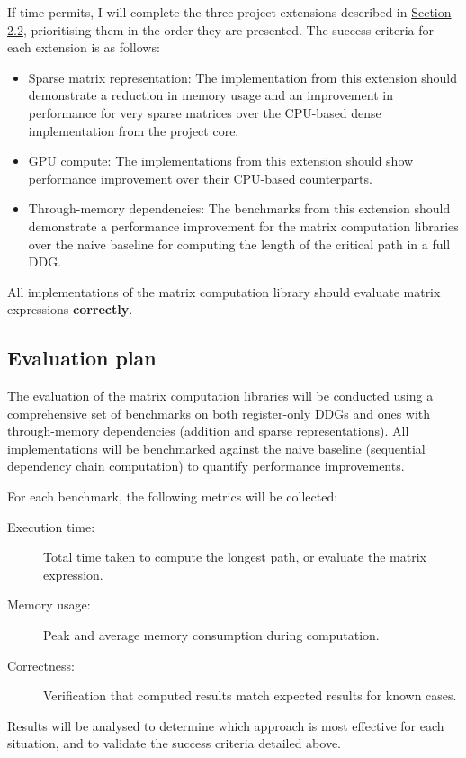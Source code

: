 \documentclass[a4paper,12pt]{article}
\begin{document}
If time permits, I will complete the three project extensions described in
\hyperref[sec:extensions]{Section 2.2}, prioritising them in the order they are presented.
The success criteria for each extension is as follows:
\begin{itemize}
  \item Sparse matrix representation: The implementation from this extension should
    demonstrate a reduction in memory usage and an improvement in performance for very
    sparse matrices over the CPU-based dense implementation from the project core.
  \item GPU compute: The implementations from this extension should show
    performance improvement over their CPU-based counterparts.
  \item Through-memory dependencies: The benchmarks from this extension should
    demonstrate a performance improvement for the matrix computation libraries over
    the naive baseline for computing the length of the critical path in a full DDG.
\end{itemize}

All implementations of the matrix computation library should evaluate matrix
expressions \textbf{correctly}.

\subsection{Evaluation plan}
\label{sec:eval}

The evaluation of the matrix computation libraries will be conducted using a
comprehensive set of benchmarks on both register-only DDGs and ones with through-memory
dependencies (addition and sparse representations).
All implementations will be benchmarked against the naive baseline (sequential
dependency chain computation) to quantify performance improvements.

For each benchmark, the following metrics will be collected:
\begin{description}
  \item[Execution time:] Total time taken to compute the longest path, or
    evaluate the matrix expression.
  \item[Memory usage:] Peak and average memory consumption during computation.
  \item [Correctness:] Verification that computed results match expected
    results for known cases.
\end{description}

Results will be analysed to determine which approach is most effective for each
situation, and to validate the success criteria detailed above.
\end{document}
